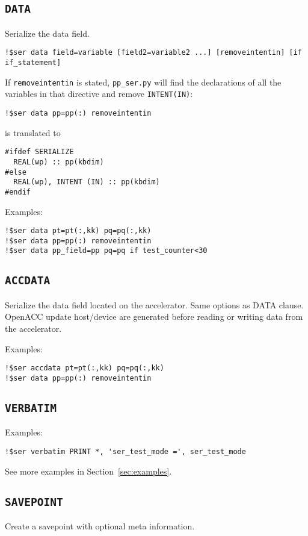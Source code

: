 \documentclass{article}
\newcommand{\ppser}{\texttt{pp\_ser.py}}
\begin{document}
\subsection{\texttt{DATA}}
Serialize the data field.

\begin{lstlisting}
!$ser data field=variable [field2=variable2 ...] [removeintentin] [if if_statement]
\end{lstlisting}

If \texttt{removeintentin} is stated, \ppser{} will find the declarations of all the variables in that directive and remove \texttt{INTENT(IN)}:
\begin{lstlisting}
!$ser data pp=pp(:) removeintentin
\end{lstlisting}
is translated to
\begin{lstlisting}
#ifdef SERIALIZE
  REAL(wp) :: pp(kbdim)
#else
  REAL(wp), INTENT (IN) :: pp(kbdim)
#endif
\end{lstlisting}

Examples:
\begin{lstlisting}
!$ser data pt=pt(:,kk) pq=pq(:,kk)
!$ser data pp=pp(:) removeintentin
!$ser data pp_field=pp pq=pq if test_counter<30
\end{lstlisting}

\subsection{\texttt{ACCDATA}}
Serialize the data field located on the accelerator. Same options as DATA clause.
OpenACC update host/device are generated before reading
or writing data from the accelerator.

Examples:
\begin{lstlisting}
!$ser accdata pt=pt(:,kk) pq=pq(:,kk)
!$ser data pp=pp(:) removeintentin
\end{lstlisting}

\subsection{\texttt{VERBATIM}}
Examples:
\begin{lstlisting}
!$ser verbatim PRINT *, 'ser_test_mode =', ser_test_mode
\end{lstlisting}

See more examples in Section~\ref{sec:examples}.

\subsection{\texttt{SAVEPOINT}}
Create a savepoint with optional meta information.
\end{document}
